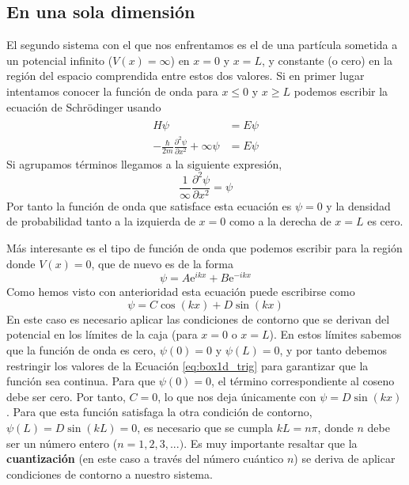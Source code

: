 \subsection{En una sola dimensión}
El segundo sistema con el que nos enfrentamos es el de una partícula
sometida a un potencial infinito ($V(x)=\infty$) en $x=0$ y $x=L$, y 
constante (o cero) en la región del espacio comprendida entre estos
dos valores. Si en primer lugar intentamos conocer la función de onda
para $x\leq 0$ y $x\geq L$ podemos escribir la ecuación de Schrödinger
usando
\begin{subequations}
    \begin{align}
         \hat{H}\psi &=E\psi  \\
         -\frac{\hbar}{2m}\frac{\partial^2\psi}{\partial x^2} + \infty\psi &=E\psi
    \end{align}    
\end{subequations}
Si agrupamos términos llegamos a la siguiente expresión,
\begin{equation}
\frac{1}{\infty}\frac{\partial^2\psi}{\partial x^2} = \psi 
\end{equation}
Por tanto la función de onda que satisface esta ecuación es
$\psi=0$ y la densidad de probabilidad tanto a la izquierda 
de $x=0$ como a la derecha de $x=L$ es cero.

Más interesante es el tipo de función de onda que podemos
escribir para la región donde $V(x)=0$, que de nuevo es de
la forma
\begin{equation}
    \psi=A\mathrm{e}^{ikx} + B\mathrm{e}^{-ikx}
\end{equation}
Como hemos visto con anterioridad esta ecuación puede 
escribirse como 
\begin{equation}
    \psi=C\cos(kx) + D\sin(kx)\label{eq:box1d_trig}
\end{equation}
En este caso es necesario aplicar las condiciones de 
contorno que se derivan del potencial en los límites de
la caja (para $x=0$ o $x=L$). En estos límites sabemos que 
la función de onda es cero, $\psi(0)=0$ y $\psi(L)=0$, y por
tanto debemos restringir los valores de la Ecuación 
\ref{eq:box1d_trig} para garantizar que la función sea 
continua. Para que $\psi(0)=0$, el término correspondiente
al coseno debe ser cero. Por tanto, $C=0$, lo que nos deja
únicamente con  $\psi=D\sin(kx)$. Para que esta función
satisfaga la otra condición de contorno, 
$\psi(L)=D\sin(kL)=0$, es necesario que se cumpla $kL=n\pi$,
donde $n$ debe ser un número entero ($n=1,2,3,...)$. Es
muy importante resaltar que la \textbf{cuantización} 
(en este caso a través del número cuántico $n$) se deriva de
aplicar condiciones de contorno a nuestro sistema.


